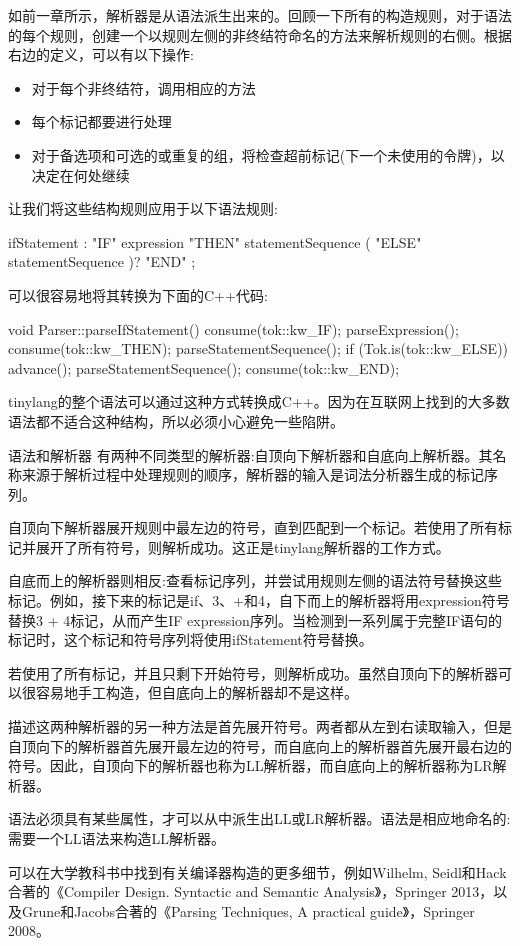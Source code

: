 如前一章所示，解析器是从语法派生出来的。回顾一下所有的构造规则，对于语法的每个规则，创建一个以规则左侧的非终结符命名的方法来解析规则的右侧。根据右边的定义，可以有以下操作:

\begin{itemize}
\item
对于每个非终结符，调用相应的方法

\item
每个标记都要进行处理

\item
对于备选项和可选的或重复的组，将检查超前标记(下一个未使用的令牌)，以决定在何处继续
\end{itemize}

让我们将这些结构规则应用于以下语法规则:

\begin{shell}
ifStatement
    : "IF" expression "THEN" statementSequence
        ( "ELSE" statementSequence )? "END" ;
\end{shell}

可以很容易地将其转换为下面的C++代码:

\begin{cpp}
void Parser::parseIfStatement() {
    consume(tok::kw_IF);
    parseExpression();
    consume(tok::kw_THEN);
    parseStatementSequence();
    if (Tok.is(tok::kw_ELSE)) {
        advance();
        parseStatementSequence();
    }
    consume(tok::kw_END);
}
\end{cpp}

tinylang的整个语法可以通过这种方式转换成C++。因为在互联网上找到的大多数语法都不适合这种结构，所以必须小心避免一些陷阱。

\begin{myTip}{语法和解析器}
有两种不同类型的解析器:自顶向下解析器和自底向上解析器。其名称来源于解析过程中处理规则的顺序，解析器的输入是词法分析器生成的标记序列。

自顶向下解析器展开规则中最左边的符号，直到匹配到一个标记。若使用了所有标记并展开了所有符号，则解析成功。这正是tinylang解析器的工作方式。

自底而上的解析器则相反:查看标记序列，并尝试用规则左侧的语法符号替换这些标记。例如，接下来的标记是if、3、+和4，自下而上的解析器将用expression符号替换3 + 4标记，从而产生IF expression序列。当检测到一系列属于完整IF语句的标记时，这个标记和符号序列将使用ifStatement符号替换。

若使用了所有标记，并且只剩下开始符号，则解析成功。虽然自顶向下的解析器可以很容易地手工构造，但自底向上的解析器却不是这样。

描述这两种解析器的另一种方法是首先展开符号。两者都从左到右读取输入，但是自顶向下的解析器首先展开最左边的符号，而自底向上的解析器首先展开最右边的符号。因此，自顶向下的解析器也称为LL解析器，而自底向上的解析器称为LR解析器。

语法必须具有某些属性，才可以从中派生出LL或LR解析器。语法是相应地命名的:需要一个LL语法来构造LL解析器。

可以在大学教科书中找到有关编译器构造的更多细节，例如Wilhelm, Seidl和Hack合著的《Compiler Design. Syntactic and Semantic Analysis》，Springer 2013，以及Grune和Jacobs合著的《Parsing Techniques, A practical guide》，Springer 2008。
\end{myTip}

